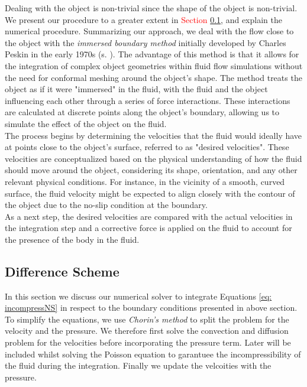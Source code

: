 Dealing with the object is non-trivial since the shape of the object is non-trivial. We present our procedure to a greater extent in \textcolor{red}{Section} \ref{}, and explain the numerical procedure. Summarizing our approach, we deal with the flow close to the object with the \textit{immersed boundary method} initially developed by Charles Peskin in the early 1970s (s. \cite{Peskin2002ImmersedBoundary}). The advantage of this method is that it allows for the integration of complex object geometries within fluid flow simulations without the need for conformal meshing around the object's shape. The method treats the object as if it were "immersed" in the fluid, with the fluid and the object influencing each other through a series of force interactions. These interactions are calculated at discrete points along the object's boundary, allowing us to simulate the effect of the object on the fluid. \\
The process begins by determining the velocities that the fluid would ideally have at points close to the object's surface, referred to as "desired velocities". These velocities are conceptualized based on the physical understanding of how the fluid should move around the object, considering its shape, orientation, and any other relevant physical conditions. For instance, in the vicinity of a smooth, curved surface, the fluid velocity might be expected to align closely with the contour of the object due to the no-slip condition at the boundary.\\
As a next step, the desired velocities are compared with the actual velocities in the integration step and a corrective force is applied on the fluid to account for the presence of the body in the fluid.


\subsection{Difference Scheme}
In this section we discuss our numerical solver to integrate Equations \ref{eq: incompressNS} in respect to the boundary conditions presented in above section. To simplify the equations, we use \textit{Chorin's method} to split the problem for the velocity and the pressure. We therefore first solve the convection and diffusion problem for the velocities before incorporating the pressure term. Later will be included whilst solving the Poisson equation to garantuee the incompressibility of the fluid during the integration. Finally we update the velcoities with the pressure. 


